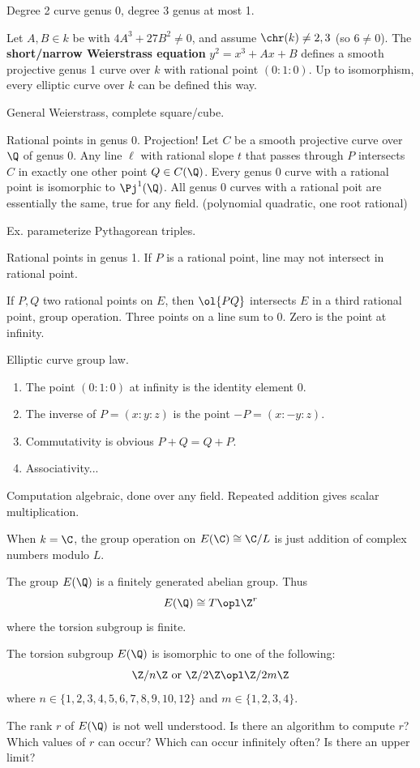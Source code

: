 Degree 2 curve genus 0, degree 3 genus at most 1.

\begin{df}
Let $A,B\in k$ be with $4A^3+27B^2\ne 0$, and assume $\chr(k)\ne 2,3$ (so $6\ne 0$). The \textbf{short/narrow Weierstrass equation} $y^2=x^3+Ax+B$ defines a smooth projective genus 1 curve over $k$ with rational point $(0:1:0)$. Up to isomorphism, every elliptic curve over $k$ can be defined this way.

General Weierstrass, complete square/cube.
\end{df}

Rational points in genus 0. Projection! 
Let $C$ be a smooth projective curve over $\Q$ of genus 0. Any line $\ell$ with rational slope $t$ that passes through $P$ intersects $C$ in exactly one other point $Q\in C(\Q)$. Every genus 0 curve with a rational point is isomorphic to $\Pj^1(\Q)$. All genus 0 curves with a rational poit are essentially the same, true for any field. (polynomial quadratic, one root rational)

Ex. parameterize Pythagorean triples.

Rational points in genus 1. If $P$ is a rational point, line may not intersect in rational point.

If $P,Q$ two rational points on $E$, then $\ol{PQ}$ intersects $E$ in a third rational point, group operation. Three points on a line sum to 0. Zero is the point at infinity.

Elliptic curve group law.
\begin{enumerate}
\item The point $(0:1:0)$ at infinity is the identity element 0.
\item The inverse of $P=(x:y:z)$ is the point $-P=(x:-y:z)$.
\item Commutativity is obvious $P+Q=Q+P$.
\item Associativity...
\end{enumerate}
Computation algebraic, done over any field. Repeated addition gives scalar multiplication.


When $k=\C$, the group operation on $E(\C)\cong \C/L$ is just addition of complex numbers modulo $L$.

\begin{thm}[Mordell]
The group $E(\Q)$ is a finitely generated abelian group. Thus
\[
E(\Q)\cong T\opl \Z^r
\]
where the torsion subgroup is finite.
\end{thm}
\begin{thm}[Mazur]
The torsion subgroup $E(\Q)$ is isomorphic to one of the following:
\[
\Z/n\Z\text{ or }\Z/2\Z\opl \Z/2m\Z
\]
where $n\in \{1,2,3,4,5,6,7,8,9,10,12\}$ and $m\in \{1,2,3,4\}$.
\end{thm}
The rank $r$ of $E(\Q)$ is not well understood. Is there an algorithm to compute $r$? Which values of $r$ can occur? Which can occur infinitely often? Is there an upper limit?

